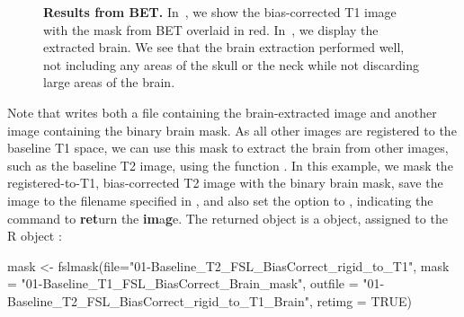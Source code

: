 \begin{figure}
\hfill
\caption[{\bf Results from BET.}]{{\bf Results from BET.} In~\protect{}, we show the bias-corrected T1 image with the mask from BET overlaid in red.  In~\protect{}, we display the extracted brain.  We see that the brain extraction performed well, not including any areas of the skull or the neck while not discarding large areas of the brain.}
\label{fig:bet}
\end{figure}

Note that  writes both a file containing the brain-extracted image and another image containing the binary brain mask.  As all other images are registered to the baseline T1 space, we can use this mask to extract the brain from other images, such as the baseline T2 image, using the  function .  In this example, we mask the registered-to-T1, bias-corrected T2 image with the binary brain mask, save the image to the filename specified in , and also set the  option to , indicating the  command to {\bf ret}urn the {\bf im}a\textbf{g}e.  The returned object is a  object, assigned to the R object :
\begin{Schunk}
\begin{Sinput}
mask <- fslmask(file="01-Baseline_T2_FSL_BiasCorrect_rigid_to_T1", 
                mask = "01-Baseline_T1_FSL_BiasCorrect_Brain_mask",
                outfile = "01-Baseline_T2_FSL_BiasCorrect_rigid_to_T1_Brain", 
                retimg = TRUE)
\end{Sinput}
\end{Schunk}
\gobblepars


